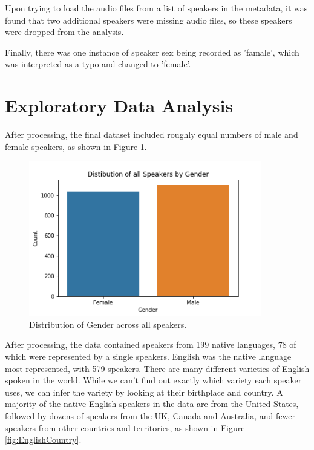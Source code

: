 Upon trying to load the audio files from a list of speakers in the metadata, it was found that two additional speakers were missing audio files, so these speakers were dropped from the analysis.

Finally, there was one instance of speaker sex being recorded as 'famale', which was interpreted as a typo and changed to 'female'. 

\section{Exploratory Data Analysis}

After processing, the final dataset included roughly equal numbers of male and female speakers, as shown in Figure \ref{fig:GenderDistAll}.

\begin{figure}[h]
\begin{center}
\includegraphics[width=4in]{GenderDistAll.png}
\caption{Distribution of Gender across all speakers.}
\label{fig:GenderDistAll}
\end{center}
\end{figure}

After processing, the data contained speakers from 199 native languages, 78 of which were represented by a single speakers.  English was the native language most represented, with 579 speakers. There are many different varieties of English spoken in the world. While we can't find out exactly which variety each speaker uses, we can infer the variety by looking at their birthplace and country. A majority of the native English speakers in the data are from the United States, followed by dozens of speakers from the UK, Canada and Australia, and fewer speakers from other countries and territories, as shown in Figure \ref{fig:EnglishCountry}.


